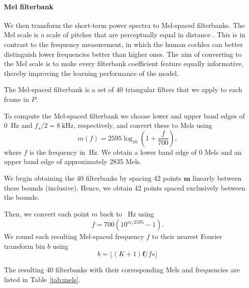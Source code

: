 		\paragraph{Mel filterbank}

			We then transform the short-term power spectra to Mel-spaced filterbanks.
			The Mel scale is a scale of pitches that are perceptually equal in distance \citep{stevens1937scale}.
			This is in contrast to the frequency measurement, in which the human cochlea can better distinguish lower frequencies better than higher ones.
			The aim of converting to the Mel scale is to make every filterbank coefficient feature equally informative, thereby improving the learning performance of the model.

			The Mel-spaced filterbank is a set of 40 triangular filters that we apply to each frame in $P$.

			To compute the Mel-spaced filterbank we choose lower and upper band edges of \SI{0}{\Hz} and $f_s/2 = \SI{8}{\kHz}$, respectively, and convert these to Mels using
			\begin{equation}
				m(f) = 2595\log_{10}\left(1 + \frac{f}{700}\right),
			\end{equation}
			where $f$ is the frequency in $\SI{}{\Hz}$.
			We obtain a lower band edge of 0 Mels and an upper band edge of approximately 2835 Mels.

			We begin obtaining the 40 filterbanks by spacing 42 points $\mathbf{m}$ linearly between these bounds (inclusive).
			Hence, we obtain 42 points spaced exclusively between the bounds.

			Then, we convert each point $m$ back to \SI{}{\Hz} using
			\begin{equation}
				f = 700\left(10^{m/2595}-1\right).
			\end{equation}
			We round each resulting Mel-spaced frequency $f$ to their nearest Fourier transform bin $b$ using
			\begin{equation}
				b = \lfloor(K+1)\mathbf{f}/fs\rfloor
			\end{equation}

			The resulting 40 filterbanks with their corresponding Mels and frequencies are listed in Table \ref{tab:mels}.


